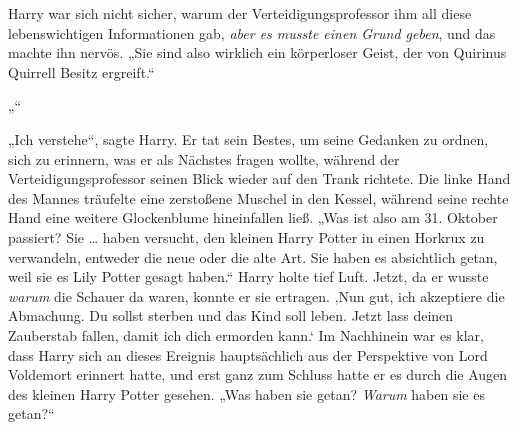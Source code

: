 Harry war sich nicht sicher, warum der Verteidigungsprofessor ihm all diese lebenswichtigen Informationen gab, \emph{aber es musste einen Grund geben}, und das machte ihn nervös.
„Sie sind also wirklich ein körperloser Geist, der von Quirinus Quirrell Besitz ergreift.“

„“

„Ich verstehe“, sagte Harry.
Er tat sein Bestes, um seine Gedanken zu ordnen, sich zu erinnern, was er als Nächstes fragen wollte, während der Verteidigungsprofessor seinen Blick wieder auf den Trank richtete. Die linke Hand des Mannes träufelte eine zerstoßene Muschel in den Kessel, während seine rechte Hand eine weitere Glockenblume hineinfallen ließ.
„Was ist also am 31. Oktober passiert? Sie … haben versucht, den kleinen Harry Potter in einen Horkrux zu verwandeln, entweder die neue oder die alte Art. Sie haben es absichtlich getan, weil sie es Lily Potter gesagt haben.“
Harry holte tief Luft. Jetzt, da er wusste \emph{warum} die Schauer da waren, konnte er sie ertragen.
‚Nun gut, ich akzeptiere die Abmachung. Du sollst sterben und das Kind soll leben. Jetzt lass deinen Zauberstab fallen, damit ich dich ermorden kann.‘
Im Nachhinein war es klar, dass Harry sich an dieses Ereignis hauptsächlich aus der Perspektive von Lord Voldemort erinnert hatte, und erst ganz zum Schluss hatte er es durch die Augen des kleinen Harry Potter gesehen.
„Was haben sie getan? \emph{Warum} haben sie es getan?“

